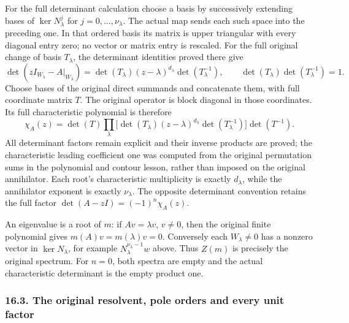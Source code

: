 \documentclass[
  11pt,
]{article}
\begin{document}
For the full determinant calculation choose a basis by successively
extending bases of \(\ker N_\lambda^j\) for \(j=0,\ldots,\nu_\lambda\).
The actual map sends each such space into the preceding one. In that
ordered basis its matrix is upper triangular with every diagonal entry
zero; no vector or matrix entry is rescaled. For the full original
change of basis \(T_\lambda\), the determinant identities proved there
give \[
 \det(zI_{W_\lambda}-A|_{W_\lambda})
   =\det(T_\lambda)(z-\lambda)^{d_\lambda}\det(T_\lambda^{-1}),
       \qquad \det(T_\lambda)\det(T_\lambda^{-1})=1.           \tag{SR7}
\] Choose bases of the original direct summands and concatenate them,
with full coordinate matrix \(T\). The original operator is block
diagonal in those coordinates. Its full characteristic polynomial is
therefore \[
 \chi_A(z)=\det(T)\prod_\lambda
       \bigl[\det(T_\lambda)(z-\lambda)^{d_\lambda}
                         \det(T_\lambda^{-1})\bigr]\det(T^{-1}).
                                                               \tag{SR8}
\] All determinant factors remain explicit and their inverse products
are proved; the characteristic leading coefficient one was computed from
the original permutation sums in the polynomial and contour lesson,
rather than imposed on the original annihilator. Each root's
characteristic multiplicity is exactly \(d_\lambda\), while the
annihilator exponent is exactly \(\nu_\lambda\). The opposite
determinant convention retains the full factor
\(\det(A-zI)=(-1)^n\chi_A(z)\).

An eigenvalue is a root of \(m\): if \(Av=\lambda v\), \(v\ne0\), then
the original finite polynomial gives \(m(A)v=m(\lambda)v=0\). Conversely
each \(W_\lambda\ne0\) has a nonzero vector in \(\ker N_\lambda\), for
example \(N_\lambda^{\nu_\lambda-1}w\) above. Thus \(Z(m)\) is precisely
the original spectrum. For \(n=0\), both spectra are empty and the
actual characteristic determinant is the empty product one.

\subsubsection{16.3. The original resolvent, pole orders and every unit
factor}\label{the-original-resolvent-pole-orders-and-every-unit-factor}
\end{document}
